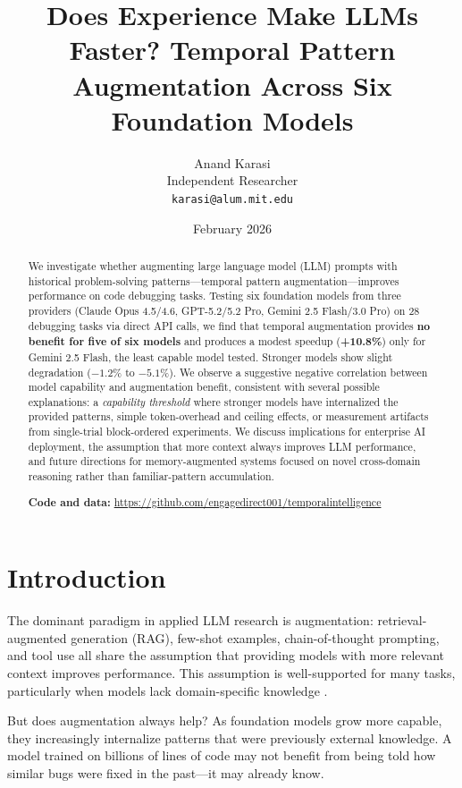 \documentclass[11pt]{article}
\title{Does Experience Make LLMs Faster? Temporal Pattern Augmentation Across Six Foundation Models}
\author{Anand Karasi\\Independent Researcher\\\texttt{karasi@alum.mit.edu}}
\date{February 2026}
\begin{document}
\maketitle

\begin{abstract}
We investigate whether augmenting large language model (LLM) prompts with historical problem-solving patterns---temporal pattern augmentation---improves performance on code debugging tasks. Testing six foundation models from three providers (Claude Opus 4.5/4.6, GPT-5.2/5.2 Pro, Gemini 2.5 Flash/3.0 Pro) on 28 debugging tasks via direct API calls, we find that temporal augmentation provides \textbf{no benefit for five of six models} and produces a modest speedup (\textbf{+10.8\%}) only for Gemini 2.5 Flash, the least capable model tested. Stronger models show slight degradation ($-1.2\%$ to $-5.1\%$). We observe a suggestive negative correlation between model capability and augmentation benefit, consistent with several possible explanations: a \emph{capability threshold} where stronger models have internalized the provided patterns, simple token-overhead and ceiling effects, or measurement artifacts from single-trial block-ordered experiments. We discuss implications for enterprise AI deployment, the assumption that more context always improves LLM performance, and future directions for memory-augmented systems focused on novel cross-domain reasoning rather than familiar-pattern accumulation.

\medskip
\noindent\textbf{Code and data:} \url{https://github.com/engagedirect001/temporalintelligence}
\end{abstract}

\section{Introduction}
\label{sec:intro}

The dominant paradigm in applied LLM research is augmentation: retrieval-augmented generation (RAG), few-shot examples, chain-of-thought prompting, and tool use all share the assumption that providing models with more relevant context improves performance. This assumption is well-supported for many tasks, particularly when models lack domain-specific knowledge \citep{lewis2020retrieval, brown2020language}.

But does augmentation always help? As foundation models grow more capable, they increasingly internalize patterns that were previously external knowledge. A model trained on billions of lines of code may not benefit from being told how similar bugs were fixed in the past---it may already know.
\end{document}
